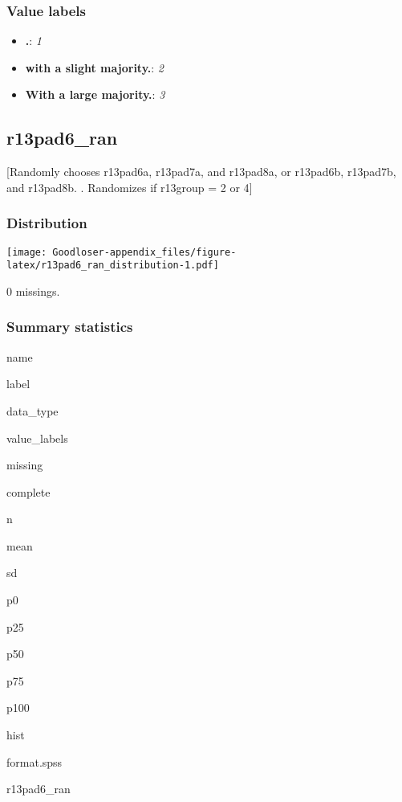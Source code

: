 \documentclass[]{book}
\providecommand{\tightlist}{%
  \setlength{\itemsep}{0pt}\setlength{\parskip}{0pt}}
\begin{document}
\subsubsection{Value labels}\label{r13pad5_vinnermargin_labels}

\begin{itemize}
\tightlist
\item
  \textbf{.}: \emph{1}
\item
  \textbf{with a slight majority.}: \emph{2}
\item
  \textbf{With a large majority.}: \emph{3}
\end{itemize}

\subsection{r13pad6\_ran}\label{r13pad6_ran}

{[}Randomly chooses r13pad6a, r13pad7a, and r13pad8a, or r13pad6b,
r13pad7b, and r13pad8b. . Randomizes if r13group = 2 or 4{]}

\subsubsection{Distribution}\label{r13pad6_ran_distribution}

\texttt{[image: Goodloser-appendix\_files/figure-latex/r13pad6\_ran\_distribution-1.pdf]}

0 missings.

\subsubsection{Summary statistics}\label{r13pad6_ran_summary}

name

label

data\_type

value\_labels

missing

complete

n

mean

sd

p0

p25

p50

p75

p100

hist

format.spss

r13pad6\_ran
\end{document}
